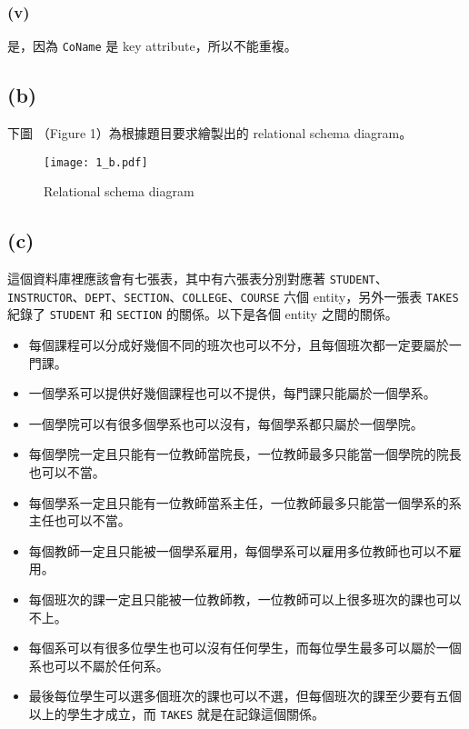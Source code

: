 \documentclass{article}
\begin{document}
\subsubsection*{(v)}
\begin{adjustwidth}{3em}{}
是，因為 \texttt{CoName} 是 key attribute，所以不能重複。
\end{adjustwidth}

\subsection*{(b)}
下圖 （Figure 1）為根據題目要求繪製出的 relational schema diagram。
\begin{figure}[H] %
    \centering
    \texttt{[image: 1\_b.pdf]} %
    \caption{Relational schema diagram} %
\end{figure}
\subsection*{(c)}
\begin{adjustwidth}{3em}{}
這個資料庫裡應該會有七張表，其中有六張表分別對應著 \texttt{STUDENT}、\texttt{INSTRUCTOR}、\texttt{DEPT}、\texttt{SECTION}、\texttt{COLLEGE}、\texttt{COURSE} 六個 entity，另外一張表 \texttt{TAKES} 紀錄了 \texttt{STUDENT} 和 \texttt{SECTION} 的關係。以下是各個 entity 之間的關係。
\begin{itemize}
\item 每個課程可以分成好幾個不同的班次也可以不分，且每個班次都一定要屬於一門課。
\item 一個學系可以提供好幾個課程也可以不提供，每門課只能屬於一個學系。
\item 一個學院可以有很多個學系也可以沒有，每個學系都只屬於一個學院。
\item 每個學院一定且只能有一位教師當院長，一位教師最多只能當一個學院的院長也可以不當。
\item 每個學系一定且只能有一位教師當系主任，一位教師最多只能當一個學系的系主任也可以不當。
\item 每個教師一定且只能被一個學系雇用，每個學系可以雇用多位教師也可以不雇用。
\item 每個班次的課一定且只能被一位教師教，一位教師可以上很多班次的課也可以不上。
\item 每個系可以有很多位學生也可以沒有任何學生，而每位學生最多可以屬於一個系也可以不屬於任何系。
\item 最後每位學生可以選多個班次的課也可以不選，但每個班次的課至少要有五個以上的學生才成立，而 \texttt{TAKES} 就是在記錄這個關係。
\end{itemize}



\end{adjustwidth}
\end{document}
